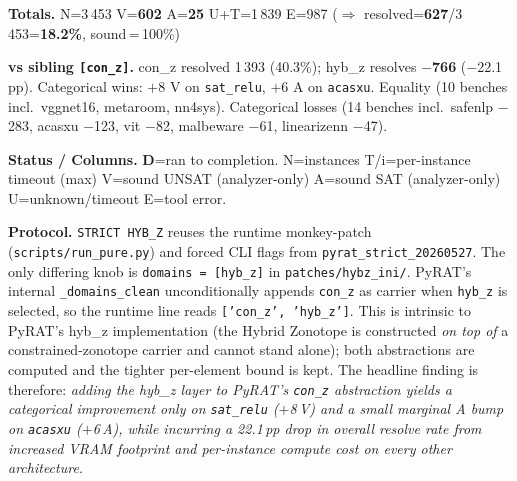 \documentclass[10pt]{beamer}
\newcommand{\sdone}{{\color{cdone}\textbf{D}}}
\begin{document}
\begin{frame}[fragile]
\vspace{0.4em}
\centering\scriptsize
\textbf{Totals.}\quad
N=3\,453\quad
V=\textbf{602}\quad
A=\textbf{25}\quad
U+T=1\,839\quad
E=987\quad
($\Rightarrow$ resolved=\textbf{627}/3\,453=\textbf{18.2\%}, sound\,=\,100\%)

\vspace{0.2em}
\centering\scriptsize
\textbf{vs sibling \texttt{[con\_z]}.}\quad
con\_z resolved 1\,393 (40.3\%);
hyb\_z resolves \textbf{$-$766} ($-$22.1\,pp). \;
Categorical wins: $+$8 V on \texttt{sat\_relu}, $+$6 A on \texttt{acasxu}.\;
Equality (10 benches incl.\ vggnet16, metaroom, nn4sys).\;
Categorical losses (14 benches incl.\ safenlp $-$283, acasxu $-$123, vit $-$82, malbeware $-$61, linearizenn $-$47).

\vspace{0.3em}
\centering\scriptsize
\textbf{Status / Columns.}\;
\sdone{}=ran to completion.\;
N=instances\;
T/i=per-instance timeout (max)\;
V=sound UNSAT (analyzer-only)\;
A=sound SAT (analyzer-only)\;
U=unknown/timeout\;
E=tool error.

\vspace{0.2em}
\centering\scriptsize
\textbf{Protocol.}\;
\texttt{STRICT HYB\_Z} reuses the runtime monkey-patch (\texttt{scripts/run\_pure.py})
and forced CLI flags from \texttt{pyrat\_strict\_20260527}. The only differing knob
is \texttt{domains = [hyb\_z]} in \texttt{patches/hybz\_ini/}. PyRAT's internal
\texttt{\_domains\_clean} unconditionally appends \texttt{con\_z} as carrier when
\texttt{hyb\_z} is selected, so the runtime line reads \texttt{['con\_z', 'hyb\_z']}.
This is intrinsic to PyRAT's hyb\_z implementation (the Hybrid Zonotope is
constructed \emph{on top of} a constrained-zonotope carrier and cannot stand
alone); both abstractions are computed and the tighter per-element bound is kept.
The headline finding is therefore: \emph{adding the hyb\_z layer to PyRAT's
\texttt{con\_z} abstraction yields a categorical improvement only on
\texttt{sat\_relu} ($+$8\,V) and a small marginal A bump on \texttt{acasxu}
($+$6\,A), while incurring a 22.1\,pp drop in overall resolve rate from increased
VRAM footprint and per-instance compute cost on every other architecture.}

\end{frame}
\end{document}
